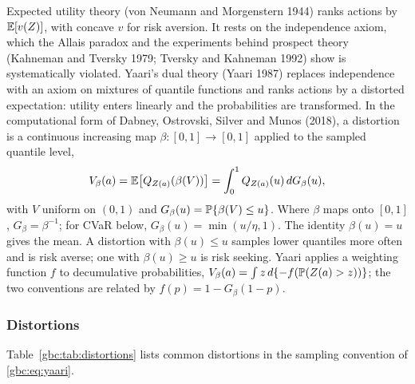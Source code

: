 Expected utility theory (von Neumann and Morgenstern 1944) ranks actions by $\mathbb{E}[v(Z)]$, with concave $v$ for risk aversion. It rests on the independence axiom, which the Allais paradox and the experiments behind prospect theory (Kahneman and Tversky 1979; Tversky and Kahneman 1992) show is systematically violated. Yaari's dual theory (Yaari 1987) replaces independence with an axiom on mixtures of quantile functions and ranks actions by a distorted expectation: utility enters linearly and the probabilities are transformed. In the computational form of Dabney, Ostrovski, Silver and Munos (2018), a distortion is a continuous increasing map $\beta:[0,1]\to[0,1]$ applied to the sampled quantile level,
\begin{equation}\label{gbc:eq:yaari}
V_{\beta}(a) = \mathbb{E}\bigl[Q_{Z(a)}(\beta(V))\bigr] = \int_0^1 Q_{Z(a)}(u)\,dG_\beta(u),
\end{equation}
with $V$ uniform on $(0,1)$ and $G_\beta(u) = \mathbb{P}\{\beta(V)\le u\}$. Where $\beta$ maps onto $[0,1]$, $G_\beta = \beta^{-1}$; for CVaR below, $G_\beta(u) = \min(u/\eta, 1)$.
The identity $\beta(u)=u$ gives the mean. A distortion with $\beta(u)\le u$ samples lower quantiles more often and is risk averse; one with $\beta(u)\ge u$ is risk seeking. Yaari applies a weighting function $f$ to decumulative probabilities, $V_{\beta}(a) = \int z\,d\{-f(\mathbb{P}(Z(a)>z))\}$; the two conventions are related by $f(p) = 1 - G_\beta(1-p)$.

\subsubsection{Distortions}

Table~\ref{gbc:tab:distortions} lists common distortions in the sampling convention of \eqref{gbc:eq:yaari}.

